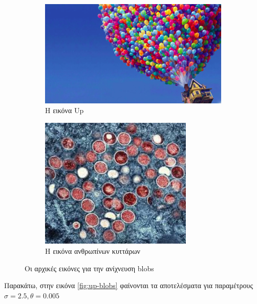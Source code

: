 \documentclass{article}
\newcommand{\eng}[1]{\foreignlanguage{english}{#1}}
\begin{document}
\begin{figure}[h]
    \begin{subfigure}{.5\textwidth}
        \centering
        \includegraphics[width=\textwidth]{../image-plots/up.png}
        \caption{Η εικόνα \eng{Up}}
        \label{fig:up}
    \end{subfigure}
    \begin{subfigure}{.5\textwidth}
        \centering
        \includegraphics[width=0.8\textwidth]{../image-plots/cells.jpg}
        \caption{Η εικόνα ανθρωπίνων κυττάρων}
        \label{fig:up}
    \end{subfigure}
    \caption{Οι αρχικές εικόνες για την ανίχνευση \eng{blobs}}
\end{figure}
\FloatBarrier

Παρακάτω, στην εικόνα \ref{fig:up-blobs} φαίνονται τα αποτελέσματα για παραμέτρους $\sigma = 2.5, \theta = 0.005$
\end{document}
